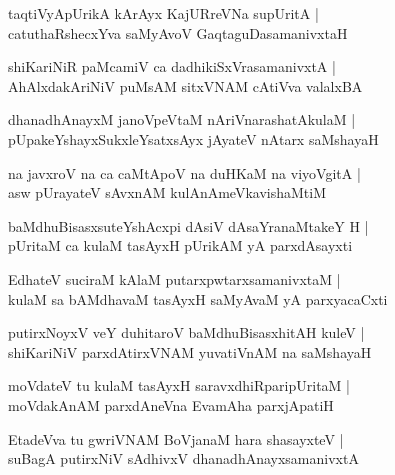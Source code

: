 \begin{shloka}
taqtiVyApUrikA kArAyx KajURreVNa supUritA |\\
catuthaRshecxYva saMyAvoV GaqtaguDasamanivxtaH 
\end{shloka}

\begin{shloka}
shiKariNiR paMcamiV ca dadhikiSxVrasamanivxtA |\\
AhAlxdakAriNiV puMsAM sitxVNAM cAtiVva valalxBA
\end{shloka}

\begin{shloka}
dhanadhAnayxM janoVpeVtaM nAriVnarashatAkulaM |\\
pUpakeYshayxSukxleYsatxsAyx jAyateV nAtarx saMshayaH 
\end{shloka}

\begin{shloka}
na javxroV na ca caMtApoV na duHKaM na viyoVgitA |\\
asw pUrayateV sAvxnAM kulAnAmeVkavishaMtiM 
\end{shloka}

\begin{shloka}
baMdhuBisasxsuteYshAcxpi dAsiV dAsaYranaMtakeY H |\\
pUritaM ca kulaM tasAyxH pUrikAM yA parxdAsayxti 
\end{shloka}

\begin{shloka}
EdhateV suciraM kAlaM putarxpwtarxsamanivxtaM |\\
kulaM sa bAMdhavaM tasAyxH saMyAvaM yA parxyacaCxti 
\end{shloka}

\begin{shloka}
putirxNoyxV veY duhitaroV baMdhuBisasxhitAH kuleV |\\
shiKariNiV parxdAtirxVNAM yuvatiVnAM na saMshayaH 
\end{shloka}

\begin{shloka}
moVdateV tu kulaM tasAyxH saravxdhiRparipUritaM |\\
moVdakAnAM parxdAneVna EvamAha parxjApatiH 
\end{shloka}

\begin{shloka}
EtadeVva tu gwriVNAM BoVjanaM hara shasayxteV |\\
suBagA putirxNiV sAdhivxV dhanadhAnayxsamanivxtA 
\end{shloka}

